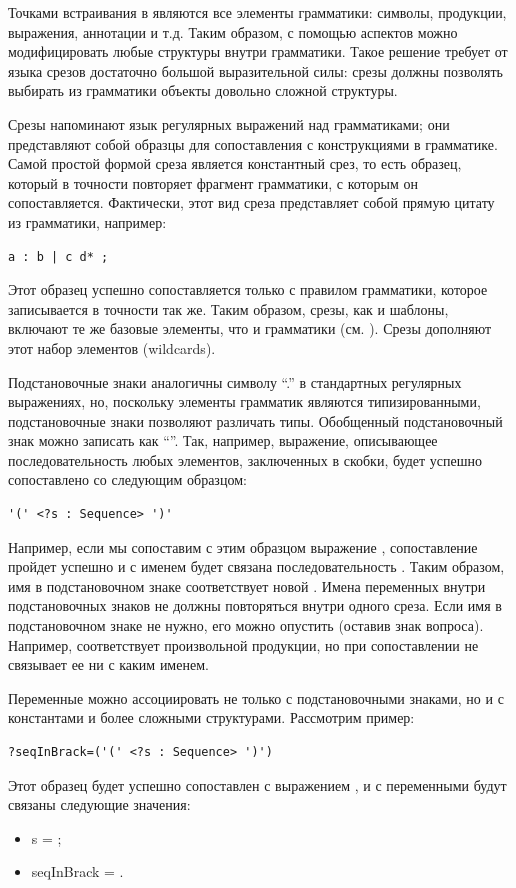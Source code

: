 Точками встраивания в  являются все элементы грамматики: символы, продукции, выражения, аннотации и т.д. Таким образом, с помощью аспектов можно модифицировать любые структуры внутри грамматики. Такое решение требует от языка срезов достаточно большой выразительной силы: срезы должны позволять выбирать из грамматики объекты довольно сложной структуры.

Срезы напоминают язык регулярных выражений над грамматиками; они представляют собой образцы для сопоставления с конструкциями в грамматике. Самой простой формой среза является константный срез, то есть образец, который в точности повторяет фрагмент грамматики, с которым он сопоставляется. Фактически, этот вид среза представляет собой прямую цитату из грамматики, например:
\begin{lstlisting}
a : b | c d* ;
\end{lstlisting}
Этот образец успешно сопоставляется только с правилом грамматики, которое записывается в точности так же. Таким образом, срезы, как и шаблоны, включают те же базовые элементы, что и грамматики (см. ). Срезы дополняют этот набор элементов  (wildcards).

Подстановочные знаки аналогичны символу ``.'' в стандартных регулярных выражениях, но, поскольку элементы грамматик являются типизированными, подстановочные знаки позволяют различать типы. Обобщенный подстановочный знак можно записать как ``''. Так, например, выражение, описывающее последовательность любых элементов, заключенных в скобки, будет успешно сопоставлено со следующим образцом:
\begin{lstlisting}
'(' <?s : Sequence> ')'
\end{lstlisting}
Например, если мы сопоставим с этим образцом выражение , сопоставление пройдет успешно и с именем  будет связана последовательность . Таким образом, имя в подстановочном знаке соответствует новой . Имена переменных внутри подстановочных знаков не должны повторяться внутри одного среза. Если имя в подстановочном знаке не нужно, его можно опустить (оставив знак вопроса). Например,  соответствует произвольной продукции, но при сопоставлении не связывает ее ни с каким именем.

Переменные можно ассоциировать не только с подстановочными знаками, но и с константами и более сложными структурами. Рассмотрим пример:
\begin{lstlisting}
?seqInBrack=('(' <?s : Sequence> ')')
\end{lstlisting}
Этот образец будет успешно сопоставлен с выражением , и с переменными будут связаны следующие значения:
\begin{itemize}
\item s = ;
\item seqInBrack = .
\end{itemize}

